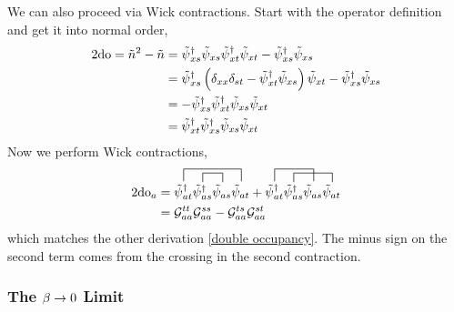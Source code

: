 We can also proceed via Wick contractions.
Start with the operator definition and get it into normal order,
\begin{align}
	2\textrm{do} = \tilde{n}^2 - \tilde{n}
	&=
	\tilde{\psi}{}^{\dagger}_{xs}\tilde{\psi}_{xs}
	\tilde{\psi}{}^{\dagger}_{xt}\tilde{\psi}_{xt}
	-
	\tilde{\psi}{}^{\dagger}_{xs}\tilde{\psi}_{xs}
	\nonumber\\
	&=
	\tilde{\psi}{}^{\dagger}_{xs}
	\left( \delta_{xx}\delta_{st} - \tilde{\psi}{}^{\dagger}_{xt}\tilde{\psi}_{xs} \right)
	\tilde{\psi}_{xt}
	-
	\tilde{\psi}{}^{\dagger}_{xs}\tilde{\psi}_{xs}
	\nonumber\\
	&=
	-\tilde{\psi}{}^{\dagger}_{xs}\tilde{\psi}{}^{\dagger}_{xt}\tilde{\psi}_{xs}\tilde{\psi}_{xt}
	\nonumber\\
	&=
	\tilde{\psi}{}^{\dagger}_{xt}\tilde{\psi}{}^{\dagger}_{xs}\tilde{\psi}_{xs}\tilde{\psi}_{xt}
\end{align}
Now we perform Wick contractions,
\begin{align}
	2\doubleOccupancy_a &= 
	\contraction[1em]{}{\tilde{\psi}\adjoint_{at}}{\tilde{\psi}\adjoint_{as}\tilde{\psi}_{as}}{\tilde{\psi}_{at}}
	\contraction[0.75em]{\tilde{\psi}\adjoint_{at}}{\tilde{\psi}\adjoint_{as}}{}{\tilde{\psi}_{as}}
	\tilde{\psi}\adjoint_{at}\tilde{\psi}\adjoint_{as}\tilde{\psi}_{as}\tilde{\psi}_{at}
	+
	\contraction[1em]{}{\tilde{\psi}\adjoint_{at}}{\tilde{\psi}\adjoint_{as}}{\tilde{\psi}_{as}}
	\contraction[0.75em]{\tilde{\psi}\adjoint_{at}}{\tilde{\psi}\adjoint_{as}}{\tilde{\psi}_{as}}{\tilde{\psi}_{at}}
	\tilde{\psi}\adjoint_{at}\tilde{\psi}\adjoint_{as}\tilde{\psi}_{as}\tilde{\psi}_{at}
	\nonumber\\
	&=
	\G^{tt}_{aa}
	\G^{ss}_{aa}
	-
	\G^{ts}_{aa}
	\G^{st}_{aa}
\end{align}
which matches the other derivation \eqref{double occupancy}.
The minus sign on the second term comes from the crossing in the second contraction.

\subsubsection{The $\beta\rightarrow0$ Limit}

